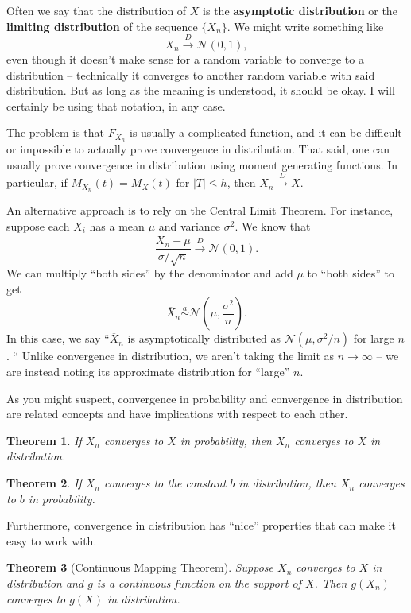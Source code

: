 \documentclass[12pt]{article}
\newcommand{\xbar}{\overline{X}}
\newcommand{\asim}{\overset{a}{\sim}}
\newcommand{\abs}[1]{\left\vert{#1}\right\vert}
\newcommand{\normal}[2]{\mathcal{N} \left({#1}, {#2} \right)}
\newcommand{\cdist}{\overset{D}{\rightarrow}}
\newtheorem{theorem}{Theorem}
\theoremstyle{definition}
\begin{document}
Often we say that the distribution of $X$ is the \textbf{asymptotic distribution} or the \textbf{limiting distribution} of the sequence $\{X_n\}$. We might write something like
	\[X_n \cdist \normal{0}{1},\]	
even though it doesn't make sense for a random variable to converge to a distribution -- technically it converges to another random variable with said distribution. But as long as the meaning is understood, it should be okay. I will certainly be using that notation, in any case. 

The problem is that $F_{X_n}$ is usually a complicated function, and it can be difficult or impossible to actually prove convergence in distribution.  That said, one can usually prove convergence in distribution using moment generating functions. In particular, if $M_{X_n}(t) = M_X(t)$ for $\abs{T} \leq h$, then $X_n \cdist X$. 

An alternative approach is to rely on the Central Limit Theorem. For instance, suppose each $X_i$ has a mean $\mu$ and variance $\sigma^2$. We know that
	\[	\frac{\xbar_n - \mu}{\sigma/\sqrt{n}} \cdist \normal{0}{1}. \]
We can multiply ``both sides'' by the denominator and add $\mu$ to  ``both sides'' to get
	\[\xbar_n \asim \normal{\mu}{\frac{\sigma^2}{n}}.	\]
In this case, we say ``$\xbar_n$ is asymptotically distributed as $\normal{\mu}{\sigma^2/n}$ for large $n$. ``  Unlike convergence in distribution, we aren't taking the limit as $n \rightarrow \infty$ -- we are instead noting its approximate distribution for ``large'' $n$.


	
As you might suspect, convergence in probability and convergence in distribution are related concepts and have implications with respect to each other. 
\begin{theorem}
	If $X_n$ converges to $X$ in probability, then $X_n$ converges to $X$ in distribution.
\end{theorem}	

\begin{theorem}If $X_n$ converges to the constant $b$ in distribution, then $X_n$ converges to $b$ in probability.	
\end{theorem}

Furthermore, convergence in distribution has ``nice'' properties that can make it easy to work with. 

\begin{theorem}[Continuous Mapping Theorem]
	Suppose $X_n$ converges to $X$ in distribution and $g$ is a continuous function on the support of $X$. Then $g(X_n)$ converges to $g(X)$ in distribution. 
\end{theorem}
\end{document}
